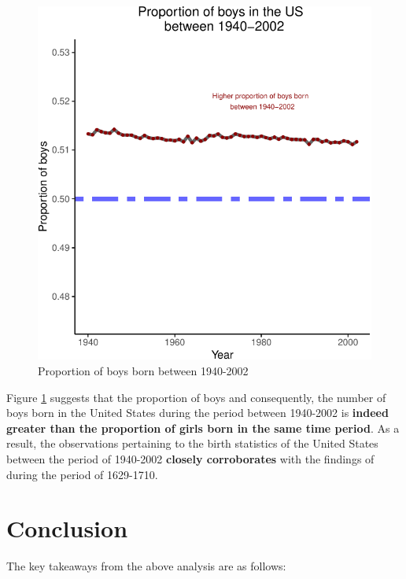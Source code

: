 \documentclass[11pt,a4paper,]{article}
\begin{document}
\begin{figure}

\includegraphics{Arindom_Baruah_32779267_files/figure-latex/propboys-1} \hfill{}

\caption{Proportion of boys born between 1940-2002}\label{fig:propboys}
\end{figure}
\normalsize

Figure \ref{fig:propboys} suggests that the proportion of boys and consequently, the number of boys born in the United States during the period between 1940-2002 is \textbf{indeed greater than the proportion of girls born in the same time period}. As a result, the observations pertaining to the birth statistics of the United States between the period of 1940-2002 \textbf{closely corroborates} with the findings of \textcite{arbuthnot1710ii} during the period of 1629-1710.

\hypertarget{conclusion}{%
\section{Conclusion}\label{conclusion}}

The key takeaways from the above analysis are as follows:
\end{document}
